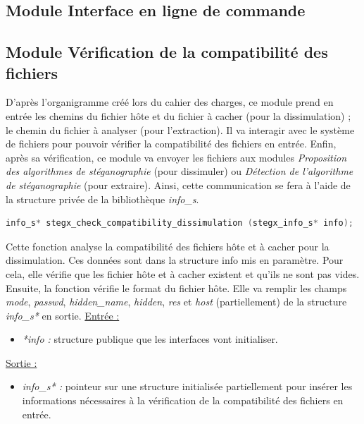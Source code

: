 \documentclass[11pt]{article}
\begin{document}
\subsection{Module Interface en ligne de commande}

\subsection{Module Vérification de la compatibilité des fichiers}

D'après l'organigramme créé lors du cahier des charges, ce module prend en 
entrée les chemins du fichier hôte et du fichier à cacher (pour la dissimulation) ; 
le chemin du fichier à analyser (pour l'extraction). Il va interagir avec 
le système de fichiers pour pouvoir vérifier la compatibilité des fichiers en entrée. 
Enfin, après sa vérification, ce module va envoyer les fichiers aux modules 
\textit{Proposition des algorithmes de stéganographie} (pour dissimuler) ou 
\textit{Détection de l'algorithme de stéganographie} (pour extraire). 
Ainsi, cette communication se fera à l'aide de la structure privée de la 
bibliothèque \textit{info\_s}. 
\newline

\begin{lstlisting}[language=c]
info_s* stegx_check_compatibility_dissimulation (stegx_info_s* info);
\end{lstlisting}

Cette fonction analyse la compatibilité des fichiers hôte et à cacher pour
la dissimulation. Ces données sont dans la structure info mis en paramètre. 
Pour cela, elle vérifie que les fichier hôte et à cacher existent et qu'ils 
ne sont pas vides. Ensuite, la fonction vérifie le format du fichier hôte. 
Elle va remplir les champs \textit{mode}, \textit{passwd}, \textit{hidden\_name}, \textit{hidden},
\textit{res} et \textit{host} (partiellement) de la structure
\textit{info\_s*} en sortie. 
\newline
\underline{Entrée :}
\begin{itemize}
\item \textit{*info :} structure publique que les interfaces vont initialiser.
\end{itemize}
\underline{Sortie :}
\begin{itemize}
\item \textit{info\_s* :} pointeur sur une structure initialisée 
partiellement pour insérer les informations nécessaires à la vérification 
de la compatibilité des fichiers en entrée. 
\newline 
\end{itemize}
\end{document}
